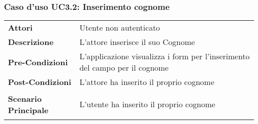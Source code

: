 \subsubsection{Caso d'uso UC3.2:  Inserimento cognome}
\label{UC3_2}

\begin{longtable}{ l | p{11cm}}
	\hline
	\rowcolor{Gray}
	 \multicolumn{2}{c}{UC3.2 - Inserimento cognome} \\
	 \hline
	\textbf{Attori} & Utente non autenticato \\
	\textbf{Descrizione} & L'attore inserisce il suo Cognome  \\
	\textbf{Pre-Condizioni} & L'applicazione visualizza i form per l'inserimento del campo per il cognome \\
	\textbf{Post-Condizioni} & L'attore ha inserito il proprio cognome \\
	\textbf{Scenario Principale} & \begin{enumerate*}[label=(\arabic*.),itemjoin={\newline}]
		\item L'utente ha inserito il proprio cognome
	\end{enumerate*}\\
\end{longtable}